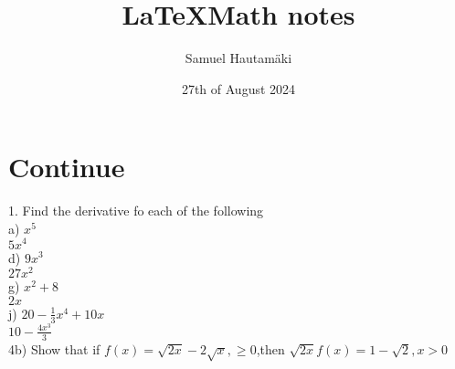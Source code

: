 \documentclass{article}
\title{\LaTeX Math notes}
\author{Samuel Hautamäki}
\date{27th of August 2024}
\begin{document}
  \maketitle
   
  \section{Continue}
  1. Find the derivative fo each of the following\\
  a) $x^5$\\
  $5x^4$\\
  d) $9x^3$\\
  $27x^2$\\
  g) $x^2+8$\\
  $2x$\\
  j) $20-\frac{1}{3}x^4+10x$\\
  $10-\frac{4x^3}{3}$\\
  4b) Show that if $f(x)=\sqrt{2x}-2\sqrt{x},\geq 0$,then $\sqrt{2x}f(x)=1-\sqrt{2},x>0$
  
  

   
\end{document}
